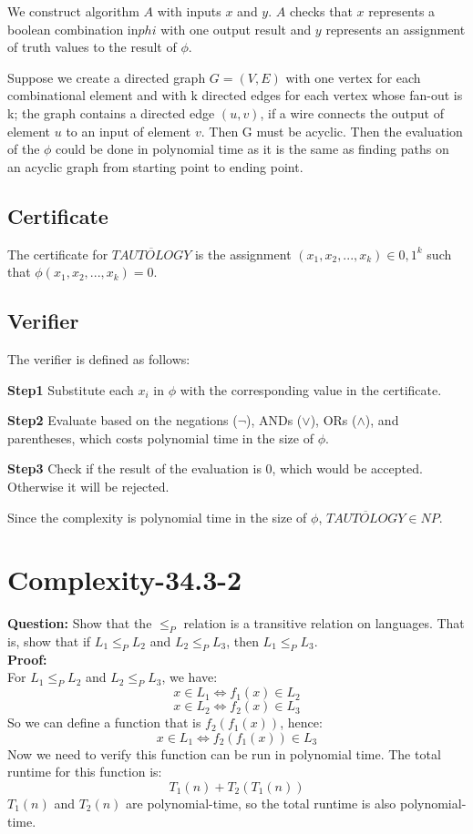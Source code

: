 \documentclass[12pt]{article}
\begin{document}
 
We construct algorithm $A$ with inputs $x$ and $y$.  $A$ checks that $x$ represents a boolean combination in$phi$  with one output result and $y$ represents an assignment of truth values to the result of $\phi$.

Suppose we create a directed graph $G=(V,E)$ with one vertex for each combinational element and with k directed edges for each vertex whose fan-out is k; the graph contains a directed edge $(u,v)$, if a wire connects the output of element $u$ to an input of element $v$. Then G must be acyclic. Then the evaluation of the $\phi$ could be done in polynomial time as it is the same as finding paths on an acyclic graph from starting point to ending point.

\subsection{Certificate}
The certificate for $\overline{TAUTOLOGY}$ is the assignment $(x_1,x_2,...,x_k) \in {0,1}^k$ such that $\phi(x_1,x_2,...,x_k) = 0$.

\subsection{Verifier}
The verifier is defined as follows:

\textbf{Step1} Substitute each $x_i$ in $\phi$ with the corresponding value in the certificate.

\textbf{Step2} Evaluate based on the negations ($\neg$), ANDs ($\vee$), ORs ($\wedge$), and parentheses, which costs polynomial time in the size of $\phi$.

\textbf{Step3} Check if the result of the evaluation is 0, which would be accepted. Otherwise it will be rejected. 

Since the complexity is polynomial time in the size of $\phi$, $\overline{TAUTOLOGY} \in NP$.

\section{Complexity-34.3-2}
\textbf{Question:} Show that the \(\leq_P\) relation is a transitive relation on languages. That is, show that if \(L_1 \leq_PL_2 \) and \(L_2\leq_P L_3\), then \(L_1\leq_P L_3\). \\
\textbf{Proof:}\\
For \(L_1 \leq_PL_2 \) and \(L_2\leq_P L_3\), we have:
\[x \in L_1 \iff f_1(x) \in L_2\]
\[x \in L_2 \iff f_2(x) \in L_3\]
So we can define a function that is \(f_2(f_1(x))\), hence:
\[x \in L_1 \iff f_2(f_1(x)) \in L_3\]
Now we need to verify this function can be run in polynomial time.
The total runtime for this function is:
\[T_1(n)+T_2(T_1(n))\]
\(T_1(n)\) and \(T_2(n)\) are polynomial-time, so the total runtime is also polynomial-time.
\end{document}
